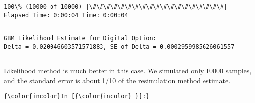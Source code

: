 \documentclass[11pt]{article}
\begin{document}
    \begin{Verbatim}[commandchars=\\\{\}]
100\% (10000 of 10000) |\#\#\#\#\#\#\#\#\#\#\#\#\#\#\#\#\#\#\#| Elapsed Time: 0:00:04 Time: 0:00:04

    \end{Verbatim}

    \begin{Verbatim}[commandchars=\\\{\}]

GBM Likelihood Estimate for Digital Option:
Delta = 0.020046603571571883, SE of Delta = 0.0002959985626061557


    \end{Verbatim}

    Likelihood method is much better in this case. We simulated only 10000
samples, and the standard error is about 1/10 of the resimulation method
estimate.

    \begin{Verbatim}[commandchars=\\\{\}]
{\color{incolor}In [{\color{incolor} }]:} 
\end{Verbatim}


    
    
    
    
\end{document}
